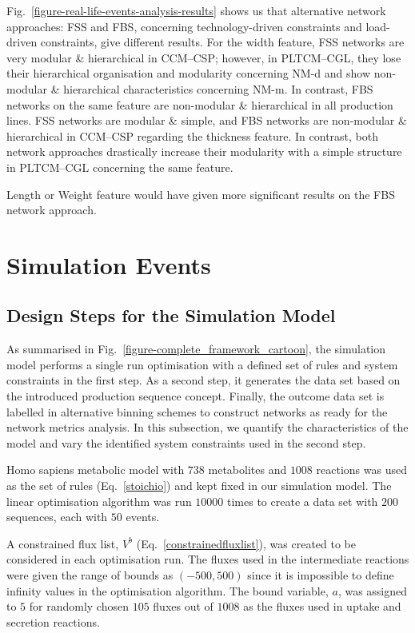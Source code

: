 Fig.~\ref{figure-real-life-events-analysis-results} shows us that alternative network approaches: FSS and FBS, concerning technology-driven constraints and load-driven constraints, give different results. For the width feature, FSS networks are very modular \& hierarchical in CCM--CSP; however, in PLTCM--CGL, they lose their hierarchical organisation and modularity concerning NM-d and show non-modular \& hierarchical characteristics concerning NM-m. In contrast, FBS networks on the same feature are non-modular \& hierarchical in all production lines. FSS networks are modular \& simple, and FBS networks are non-modular \& hierarchical in CCM--CSP regarding the thickness feature. In contrast, both network approaches drastically increase their modularity with a simple structure in PLTCM--CGL concerning the same feature.

{\color{red} Length or Weight feature would have given more significant results on the FBS network approach.}
\clearpage

\section{Simulation Events}
\subsection{Design Steps for the Simulation Model}

As summarised in Fig.~\ref{figure-complete_framework_cartoon}, the simulation model performs a single run optimisation with a defined set of rules and system constraints in the first step. As a second step, it generates the data set based on the introduced production sequence concept. Finally, the outcome data set is labelled in alternative binning schemes to construct networks as ready for the network metrics analysis. In this subsection, we quantify the characteristics of the model and vary the identified system constraints used in the second step.

Homo sapiens metabolic model with $738$ metabolites and $1008$ reactions was used as the set of rules (Eq.~\ref{stoichio}) and kept fixed in our simulation model. The linear optimisation algorithm was run $10000$ times to create a data set with $200$ sequences, each with $50$ events.

A constrained flux list, $V^{b}$ (Eq.~\ref{constrainedfluxlist}), was created to be considered in each optimisation run. The fluxes used in the intermediate reactions were given the range of bounds as $(-500, 500)$ since it is impossible to define infinity values in the optimisation algorithm. The bound variable, $a$, was assigned to $5$ for randomly chosen $105$ fluxes out of $1008$ as the fluxes used in uptake and secretion reactions.

